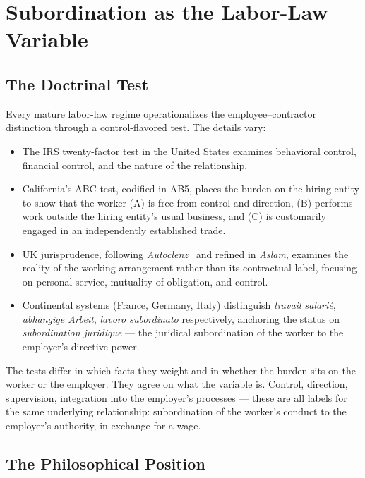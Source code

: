 \documentclass[11pt,a4paper]{article}
\theoremstyle{remark}
\begin{document}
\section{Subordination as the Labor-Law Variable}
\label{sec:subordination}

\subsection{The Doctrinal Test}

Every mature labor-law regime operationalizes the
employee--contractor distinction through a control-flavored test.
The details vary:

\begin{itemize}
  \item The IRS twenty-factor test in the United States examines
    behavioral control, financial control, and the nature of the
    relationship.
  \item California's ABC test, codified in AB5, places the burden
    on the hiring entity to show that the worker
    (A) is free from control and direction,
    (B) performs work outside the hiring entity's usual business,
    and (C) is customarily engaged in an independently established
    trade.
  \item UK jurisprudence, following \emph{Autoclenz}~\citep{autoclenz_2011}
    and refined in \emph{Aslam}, examines the reality of the
    working arrangement rather than its contractual label,
    focusing on personal service, mutuality of obligation, and
    control.
  \item Continental systems (France, Germany, Italy) distinguish
    \emph{travail salarié}, \emph{abh\"angige Arbeit},
    \emph{lavoro subordinato} respectively, anchoring the status
    on \emph{subordination juridique} --- the juridical subordination
    of the worker to the employer's directive power.
\end{itemize}

The tests differ in which facts they weight and in whether the
burden sits on the worker or the employer. They agree on what the
variable is. Control, direction, supervision, integration into the
employer's processes --- these are all labels for the same underlying
relationship: subordination of the worker's conduct to the employer's
authority, in exchange for a wage.

\subsection{The Philosophical Position}
\end{document}
